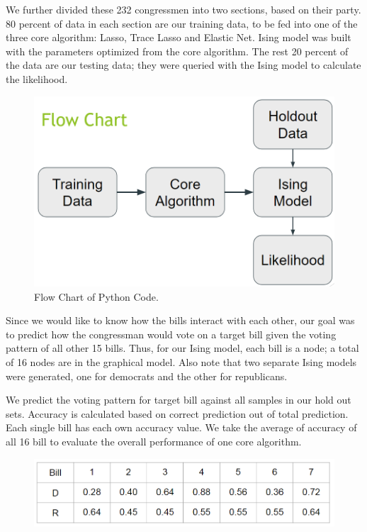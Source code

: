 \documentclass[11pt]{article}
\begin{document}
We further divided these 232 congressmen into two sections, based on their party. 80 percent of data in each section are our training data, to be fed into one of the three core algorithm: Lasso, Trace Lasso and Elastic Net. Ising model was built with the parameters optimized from the core algorithm. The rest 20 percent of the data are our testing data; they were queried with the Ising model to calculate the likelihood. 

\begin{figure}[h!]
\includegraphics[scale=0.5]{Control_Flow}
\centering
\caption{Flow Chart of Python Code.}
\end{figure}

Since we would like to know how the bills interact with each other, our goal was to predict how the congressman would vote on a target bill given the voting pattern of all other 15 bills. Thus, for our Ising model, each bill is a node; a total of 16 nodes are in the graphical model. Also note that two separate Ising models were generated, one for democrats and the other for republicans.

We predict the voting pattern for target bill against all samples in our hold out sets. Accuracy is calculated based on correct prediction out of total prediction. Each single bill has each own accuracy value. We take the average of accuracy of all 16 bill to evaluate the overall performance of one core algorithm. 

\begin{figure}[h!]
\includegraphics[scale=0.5]{CVP1}
\centering
\end{figure}
\end{document}
